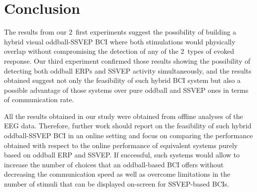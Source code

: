 \documentclass[10pt]{article}
\begin{document}
    \subsection{}
    \label{sec:4Discuss2}


  
\section{Conclusion}
\label{sec:6Conclusion}
The results from our 2~first experiments suggest the possibility of building a hybrid visual oddball-SSVEP BCI where both stimulations would physically overlap without compromising the detection of any of the 2~types of evoked response.
Our third experiment confirmed those results showing the possibility of detecting both oddball ERPs and SSVEP activity simultaneously, and the results obtained suggest not only the feasibility of such hybrid BCI system but also a possible advantage of those systems over pure oddball and SSVEP ones in terms of communication rate.

All the results obtained in our study were obtained from offline analyses of the EEG data.
Therefore, further work should report on the feasibility of such hybrid oddball-SSVEP BCI in an online setting and focus on comparing the performance obtained with respect to the online performance of equivalent systems purely based on oddball ERP and SSVEP.
If successful, such systems would allow to increase the number of choices that an oddball-based BCI offers without decreasing the communication speed as well as overcome limitations in the number of stimuli that can be displayed on-screen for SSVEP-based BCIs.
\end{document}
